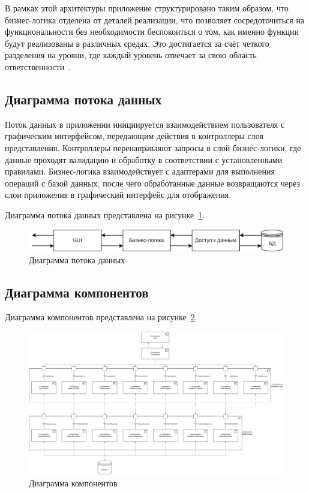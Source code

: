 В рамках этой архитектуры приложение структурировано таким образом, что бизнес-логика отделена от деталей реализации, что позволяет сосредоточиться на функциональности без необходимости беспокоиться о том, как именно функции будут реализованы в различных средах. Это достигается за счёт четкого разделения на уровни, где каждый уровень отвечает за свою область ответственности~\cite{lit10}.

\subsection{Диаграмма потока данных}

Поток данных в приложении инициируется взаимодействием пользователя с графическим интерфейсом, передающим действия в контроллеры слоя представления. Контроллеры перенаправляют запросы в слой бизнес-логики, где данные проходят валидацию и обработку в соответствии с установленными правилами. Бизнес-логика взаимодействует с адаптерами для выполнения операций с базой данных, после чего обработанные данные возвращаются через слои приложения в графический интерфейс для отображения.

Диаграмма потока данных представлена на рисунке~\ref{fig:data-flow}.

\begin{figure}[h]
	\centering
	\includegraphics[width=1\textwidth]{images/data-flow.png}
	\caption{Диаграмма потока данных} 
	\label{fig:data-flow} 
\end{figure}

\subsection{Диаграмма компонентов}

Диаграмма компонентов представлена на рисунке~\ref{fig:components-diagram}.

\begin{figure}[h]
	\centering
	\includegraphics[width=1\textwidth]{images/uml-components.png}
	\caption{Диаграмма компонентов} 
	\label{fig:components-diagram} 
\end{figure}


